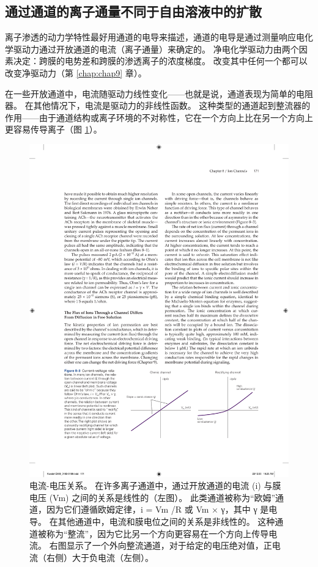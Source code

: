 \subsection{通过通道的离子通量不同于自由溶液中的扩散}
离子渗透的动力学特性最好用通道的电导来描述，通道的电导是通过测量响应电化学驱动力通过开放通道的电流（离子通量）来确定的。 
净电化学驱动力由两个因素决定：跨膜的电势差和跨膜的渗透离子的浓度梯度。 
改变其中任何一个都可以改变净驱动力（第 \ref{chap:chap9} 章）。


在一些开放通道中，电流随驱动力线性变化——也就是说，通道表现为简单的电阻器。 
在其他情况下，电流是驱动力的非线性函数。 
这种类型的通道起到整流器的作用——由于通道结构或离子环境的不对称性，它在一个方向上比在另一个方向上更容易传导离子（图 \ref{fig:8_3}）。


\begin{figure}[htbp]
	\centering
	\includegraphics[width=1.0\linewidth]{chap08/fig_8_3}
	\caption{电流-电压关系。 在许多离子通道中，通过开放通道的电流 (i) 与膜电压 (Vm) 之间的关系是线性的（左图）。 此类通道被称为“欧姆”通道，因为它们遵循欧姆定律，i = Vm /R 或 Vm × γ，其中 γ 是电导。 在其他通道中，电流和膜电位之间的关系是非线性的。 这种通道被称为“整流”，因为它比另一个方向更容易在一个方向上传导电流。 右图显示了一个外向整流通道，对于给定的电压绝对值，正电流（右侧）大于负电流（左侧）。}
	\label{fig:8_3}
\end{figure}

